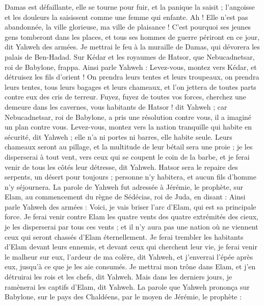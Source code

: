 \begin{multicols}{2}
Damas est défaillante, elle se tourne pour fuir, et la panique la saisit ; l'angoisse et les douleurs la saisissent comme une femme qui enfante.
Ah ! Elle n'est pas abandonnée, la ville glorieuse, ma ville de plaisance !
C'est pourquoi ses jeunes gens tomberont dans les places, et tous ses hommes de guerre périront en ce jour, dit Yahweh des armées.
Je mettrai le feu à la muraille de Damas, qui dévorera les palais de Ben-Hadad.
Sur Kédar et les royaumes de Hatsor, que Nebucadnetsar, roi de Babylone, frappa. Ainsi parle Yahweh : Levez-vous, montez vers Kédar, et détruisez les fils d'orient !
On prendra leurs tentes et leurs troupeaux, on prendra leurs tentes, tous leurs bagages et leurs chameaux, et l'on jettera de toutes parts contre eux des cris de terreur.
Fuyez, fuyez de toutes vos forces, cherchez une demeure dans les cavernes, vous habitants de Hatsor ! dit Yahweh ; car Nebucadnetsar, roi de Babylone, a pris une résolution contre vous, il a imaginé un plan contre vous.
Levez-vous, montez vers la nation tranquille qui habite en sécurité, dit Yahweh ; elle n'a ni portes ni barres, elle habite seule.
Leurs chameaux seront au pillage, et la multitude de leur bétail sera une proie ; je les disperserai à tout vent, vers ceux qui se coupent le coin de la barbe, et je ferai venir de tous les côtés leur détresse, dit Yahweh.
Hatsor sera le repaire des serpents, un désert pour toujours ; personne n'y habitera, et aucun fils d'homme n'y séjournera.
La parole de Yahweh fut adressée à Jérémie, le prophète, sur Elam, au commencement du règne de Sédécias, roi de Juda, en disant :
Ainsi parle Yahweh des armées : Voici, je vais briser l'arc d'Elam, qui est sa principale force.
Je ferai venir contre Elam les quatre vents des quatre extrémités des cieux, je les disperserai par tous ces vents ; et il n'y aura pas une nation où ne viennent ceux qui seront chassés d'Elam éternellement.
Je ferai trembler les habitants d'Elam devant leurs ennemis, et devant ceux qui cherchent leur vie, je ferai venir le malheur sur eux, l'ardeur de ma colère, dit Yahweh, et j'enverrai l'épée après eux, jusqu'à ce que je les aie consumés.
Je mettrai mon trône dans Elam, et j'en détruirai les rois et les chefs, dit Yahweh.
Mais dans les derniers jours, je ramènerai les captifs d'Elam, dit Yahweh.
\VerseOne{}La parole que Yahweh prononça sur Babylone, sur le pays des Chaldéens, par le moyen de Jérémie, le prophète :

\end{multicols}
